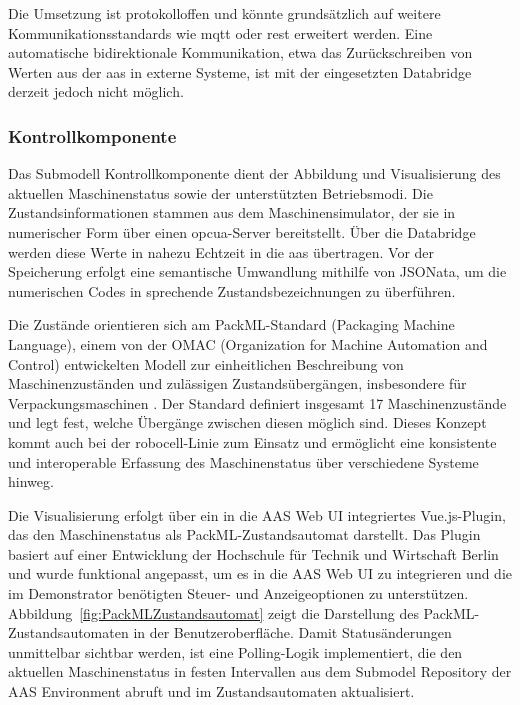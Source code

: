 Die Umsetzung ist protokolloffen und könnte grundsätzlich auf weitere Kommunikationsstandards wie \acs{mqtt} oder \acs{rest} erweitert werden.
Eine automatische bidirektionale Kommunikation, etwa das Zurückschreiben von Werten aus der \acs{aas} in externe Systeme, ist mit der eingesetzten Databridge derzeit jedoch nicht möglich.

\subsubsection*{Kontrollkomponente}
Das Submodell Kontrollkomponente dient der Abbildung und Visualisierung des aktuellen Maschinenstatus sowie der unterstützten Betriebsmodi.
Die Zustandsinformationen stammen aus dem Maschinensimulator, der sie in numerischer Form über einen \acs{opcua}-Server bereitstellt.
Über die Databridge werden diese Werte in nahezu Echtzeit in die \acs{aas} übertragen.
Vor der Speicherung erfolgt eine semantische Umwandlung mithilfe von JSONata, um die numerischen Codes in sprechende Zustandsbezeichnungen zu überführen.

Die Zustände orientieren sich am PackML-Standard (Packaging Machine Language), einem von der OMAC (Organization for Machine Automation and Control) entwickelten Modell zur einheitlichen Beschreibung von Maschinenzuständen und zulässigen Zustandsübergängen, insbesondere für Verpackungsmaschinen \cite{OMAC}. 
Der Standard definiert insgesamt 17 Maschinenzustände und legt fest, welche Übergänge zwischen diesen möglich sind. 
Dieses Konzept kommt auch bei der robocell-Linie zum Einsatz und ermöglicht eine konsistente und interoperable Erfassung des Maschinenstatus über verschiedene Systeme hinweg.

Die Visualisierung erfolgt über ein in die AAS Web UI integriertes Vue.js-Plugin, das den Maschinenstatus als PackML-Zustandsautomat darstellt.
Das Plugin basiert auf einer Entwicklung der Hochschule für Technik und Wirtschaft Berlin \cite{HTW1, HTW2} und wurde funktional angepasst, um es in die AAS Web UI zu integrieren und die im Demonstrator benötigten Steuer- und Anzeigeoptionen zu unterstützen.
Abbildung~\ref{fig:PackMLZustandsautomat} zeigt die Darstellung des PackML-Zustandsautomaten in der Benutzeroberfläche.
Damit Statusänderungen unmittelbar sichtbar werden, ist eine Polling-Logik implementiert, die den aktuellen Maschinenstatus in festen Intervallen aus dem Submodel Repository der AAS Environment abruft und im Zustandsautomaten aktualisiert.

